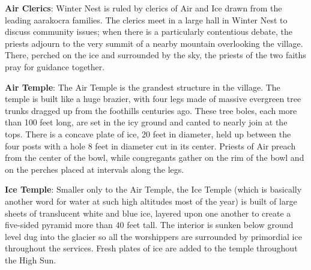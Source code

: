{
	\textbf{Air Clerics}: Winter Nest is ruled by clerics of Air and Ice drawn from the leading aarakocra families. The clerics meet in a large hall in Winter Nest to discuss community issues; when there is a particularly contentious debate, the priests adjourn to the very summit of a nearby mountain overlooking the village. There, perched on the ice and surrounded by the sky, the priests of the two faiths pray for guidance together.	
}
{}
{
	\textbf{Air Temple}: The Air Temple is the grandest structure in the village. The temple is built like a huge brazier, with four legs made of massive evergreen tree trunks dragged up from the foothills centuries ago. These tree boles, each more than 100 feet long, are set in the icy ground and canted to nearly join at the tops. There is a concave plate of ice, 20 feet in diameter, held up between the four posts with a hole 8 feet in diameter cut in its center. Priests of Air preach from the center of the bowl, while congregants gather on the rim of the bowl and on the perches placed at intervals along the legs.

	\textbf{Ice Temple}: Smaller only to the Air Temple, the Ice Temple (which is basically another word for water at such high altitudes most of the year) is built of large sheets of translucent white and blue ice, layered upon one another to create a five-sided pyramid more than 40 feet tall. The interior is sunken below ground level dug into the glacier so all the worshippers are surrounded by primordial ice throughout the services. Fresh plates of ice are added to the temple throughout the High Sun.
}
